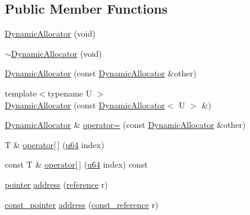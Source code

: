 \subsection*{Public Member Functions}
\begin{DoxyCompactItemize}
\item 
\hyperlink{classcrap_1_1memory_1_1_dynamic_allocator_a3012f54f984532b6e2d1029f9c142770}{Dynamic\-Allocator} (void)
\item 
\hyperlink{classcrap_1_1memory_1_1_dynamic_allocator_adf77eab3410a26a5b40e6708c3fae59f}{$\sim$\-Dynamic\-Allocator} (void)
\item 
\hyperlink{classcrap_1_1memory_1_1_dynamic_allocator_a5f56cec0c5b215bc26601d6a49a697f9}{Dynamic\-Allocator} (const \hyperlink{classcrap_1_1memory_1_1_dynamic_allocator}{Dynamic\-Allocator} \&other)
\item 
{\footnotesize template$<$typename U $>$ }\\\hyperlink{classcrap_1_1memory_1_1_dynamic_allocator_a1b5d4af84e9832ac31718cda27f469c6}{Dynamic\-Allocator} (const \hyperlink{classcrap_1_1memory_1_1_dynamic_allocator}{Dynamic\-Allocator}$<$ U $>$ \&)
\item 
\hyperlink{classcrap_1_1memory_1_1_dynamic_allocator}{Dynamic\-Allocator} \& \hyperlink{classcrap_1_1memory_1_1_dynamic_allocator_a15165a431d05919333b48a46529e321d}{operator=} (const \hyperlink{classcrap_1_1memory_1_1_dynamic_allocator}{Dynamic\-Allocator} \&other)
\item 
T \& \hyperlink{classcrap_1_1memory_1_1_dynamic_allocator_aeb38d63da16a7c69ce8714d127d3a9fa}{operator\mbox{[}$\,$\mbox{]}} (\hyperlink{types_8h_a3f7e2bcbb0b4c338f3c4f6c937cd4234}{u64} index)
\item 
const T \& \hyperlink{classcrap_1_1memory_1_1_dynamic_allocator_ab7488a1c8177ec2c5c0af8e65df04c64}{operator\mbox{[}$\,$\mbox{]}} (\hyperlink{types_8h_a3f7e2bcbb0b4c338f3c4f6c937cd4234}{u64} index) const 
\item 
\hyperlink{classcrap_1_1memory_1_1_dynamic_allocator_a281b8cb1ad7cd494edf5f6b67daea60a}{pointer} \hyperlink{classcrap_1_1memory_1_1_dynamic_allocator_a4f03d89bcf2b7728237564b79c7ea516}{address} (\hyperlink{classcrap_1_1memory_1_1_dynamic_allocator_ad17b30d2ee05bca34e1a3ea8d212db16}{reference} r)
\item 
\hyperlink{classcrap_1_1memory_1_1_dynamic_allocator_a31367ceafaf5d2a05c3a04e975e53775}{const\-\_\-pointer} \hyperlink{classcrap_1_1memory_1_1_dynamic_allocator_a98c5265ecbed3f9a745e00637a6f123c}{address} (\hyperlink{classcrap_1_1memory_1_1_dynamic_allocator_aa4033bbb72cceae0d908aec9a9539f81}{const\-\_\-reference} r)

\end{DoxyCompactItemize}
